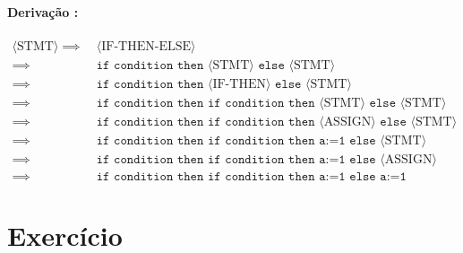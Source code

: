\documentclass[a4paper, 12pt]{article}
\newcommand{\rom}[1]{\uppercase\expandafter{\romannumeral #1\relax}}
\begin{document}
\paragraph{Derivação \rom{2}:}

{\footnotesize
\begin{align*}
    \langle \text{STMT} \rangle \implies & \: \langle \text{IF-THEN-ELSE} \rangle \\
    \implies & \: \texttt{if condition then } \langle \text{STMT} \rangle\texttt{ else } \langle \text{STMT} \rangle \\
    \implies & \: \texttt{if condition then } \langle \text{IF-THEN} \rangle\texttt{ else } \langle \text{STMT} \rangle \\
    \implies & \: \texttt{if condition then if condition then } \langle \text{STMT} \rangle\texttt{ else } \langle \text{STMT} \rangle \\
    \implies & \: \texttt{if condition then if condition then } \langle \text{ASSIGN} \rangle\texttt{ else } \langle \text{STMT} \rangle \\
    \implies & \: \texttt{if condition then if condition then a:=1 else } \langle \text{STMT} \rangle \\
    \implies & \: \texttt{if condition then if condition then a:=1 else } \langle \text{ASSIGN} \rangle \\
    \implies & \: \texttt{if condition then if condition then a:=1 else a:=1}
\end{align*}
}%

\newpage
\section*{Exercício \rom{4}} \label{sec:ex4}
\end{document}
